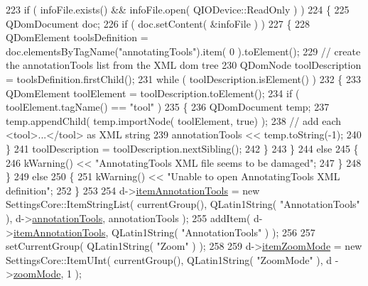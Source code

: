 \begin{DoxyCode}
223       \textcolor{keywordflow}{if} ( infoFile.exists() && infoFile.open( QIODevice::ReadOnly ) )
224       \{
225           QDomDocument doc;
226           \textcolor{keywordflow}{if} ( doc.setContent( &infoFile ) )
227           \{
228               QDomElement toolsDefinition = doc.elementsByTagName(\textcolor{stringliteral}{"annotatingTools"}).item( 0 ).toElement();
229                \textcolor{comment}{// create the annotationTools list from the XML dom tree}
230               QDomNode toolDescription = toolsDefinition.firstChild();
231               \textcolor{keywordflow}{while} ( toolDescription.isElement() )
232               \{
233                   QDomElement toolElement = toolDescription.toElement();
234                   \textcolor{keywordflow}{if} ( toolElement.tagName() == \textcolor{stringliteral}{"tool"} )
235                   \{
236                       QDomDocument temp;
237                       temp.appendChild( temp.importNode( toolElement, \textcolor{keyword}{true}) );
238                       \textcolor{comment}{// add each <tool>...</tool> as XML string}
239                       annotationTools << temp.toString(-1);
240                   \}
241                   toolDescription = toolDescription.nextSibling();
242               \}
243           \}
244           \textcolor{keywordflow}{else}
245           \{
246               kWarning() << \textcolor{stringliteral}{"AnnotatingTools XML file seems to be damaged"};
247           \}
248       \}
249       \textcolor{keywordflow}{else}
250       \{
251           kWarning() << \textcolor{stringliteral}{"Unable to open AnnotatingTools XML definition"};
252       \}
253     
254   d->\hyperlink{classOkular_1_1SettingsPrivate_a7e00c8908af893f273be9102ad3c6b73}{itemAnnotationTools} = \textcolor{keyword}{new} SettingsCore::ItemStringList( currentGroup(), 
      QLatin1String( \textcolor{stringliteral}{"AnnotationTools"} ), d->\hyperlink{classOkular_1_1SettingsPrivate_a8101a5e16abef42c29ad8a4459f9f62e}{annotationTools}, annotationTools );
255   addItem( d->\hyperlink{classOkular_1_1SettingsPrivate_a7e00c8908af893f273be9102ad3c6b73}{itemAnnotationTools}, QLatin1String( \textcolor{stringliteral}{"AnnotationTools"} ) );
256 
257   setCurrentGroup( QLatin1String( \textcolor{stringliteral}{"Zoom"} ) );
258 
259   d->\hyperlink{classOkular_1_1SettingsPrivate_a63b3fe05c0719de0f94cfbab41d4f52e}{itemZoomMode} = \textcolor{keyword}{new} SettingsCore::ItemUInt( currentGroup(), QLatin1String( \textcolor{stringliteral}{"ZoomMode"} ), d
      ->\hyperlink{classOkular_1_1SettingsPrivate_a6dcb996680cc0053eb1acf6bb98f05c8}{zoomMode}, 1 );

\end{DoxyCode}
